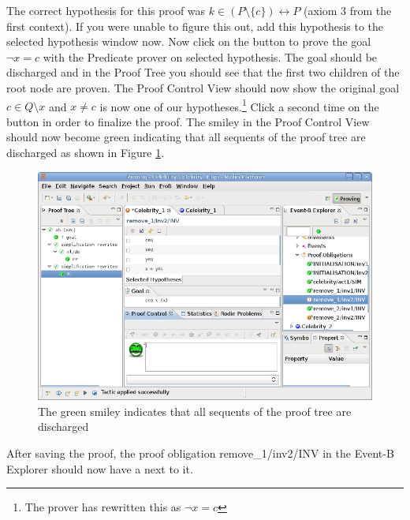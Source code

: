 The correct hypothesis for this proof was $k \in  (P \setminus  \{ c\} ) \rel  P$ (axiom 3 from the first context). If you were unable to figure this out, add this hypothesis to the selected hypothesis window now. Now click on the  button to prove the goal $\lnot x = c$ with the \textsf{Predicate prover on selected hypothesis}. The goal should be discharged and in the Proof Tree you should see that the first two children of the root node are proven. The \textsf{Proof Control View} should now show the original goal $c \in Q \setminus {x}$ and $x\neq c$ is now one of our hypotheses.\footnote{The prover has rewritten this as $ \lnot x = c$} Click a second time on the  button in order to finalize the proof. The smiley in the \textsf{Proof Control View} should now become green indicating that all sequents of the proof tree are discharged as shown in Figure \ref{fig_tut_08_proof_final}.

\begin{figure}[!ht]
\begin{center}
	\includegraphics{img/tutorial/tut_08_proof_final.png}
	\caption{The green smiley indicates that all sequents of the proof tree are discharged}
	\label{fig_tut_08_proof_final}
\end{center}
\end{figure}

After saving the proof, the proof obligation \textsf{remove\_1/inv2/INV} in the \textsf{Event-B Explorer} should now have a  next to it.


